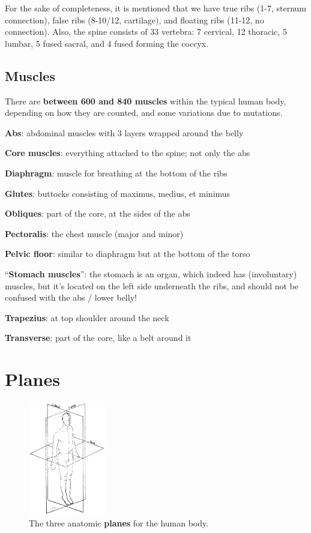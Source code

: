 For the sake of completeness, it is mentioned that we have true ribs (1-7, sternum connection), false ribs (8-10/12, cartilage), and floating ribs (11-12, no connection).
Also, the spine consists of 33 vertebra: 7 cervical, 12 thoracic, 5 lumbar, 5 fused sacral, and 4 fused forming the coccyx.

\subsection{Muscles}\label{subsec:muscles}

There are \textbf{between 600 and 840 muscles} within the typical human body, depending on how they are counted, and some variations due to mutations.

\begin{itemize*}
    \item \textbf{Abs}: abdominal muscles with 3 layers wrapped around the belly
    \item \textbf{Core muscles}: everything attached to the spine; not only the abs
    \item \textbf{Diaphragm}: muscle for breathing at the bottom of the ribs
    \item \textbf{Glutes}: buttocks consisting of maximus, medius, et minimus
    \item \textbf{Obliques}: part of the core, at the sides of the abs
    \item \textbf{Pectoralis}: the chest muscle (major and minor)
    \item \textbf{Pelvic floor}: similar to diaphragm but at the bottom of the torso
    \item ``\textbf{Stomach muscles}'': the stomach is an organ, which indeed has (involuntary) muscles, but it's located on the left side underneath the ribs, and should not be confused with the abs / lower belly!
    \item \textbf{Trapezius}: at top shoulder around the neck
    \item \textbf{Transverse}: part of the core, like a belt around it
\end{itemize*}

\section{Planes}\label{sec:planes}

\begin{figure}
    \centering
    \includegraphics[width=0.3\textwidth]{images/anatomy/planes}
    \caption{The three anatomic \textbf{planes} for the human body.}
\end{figure}

